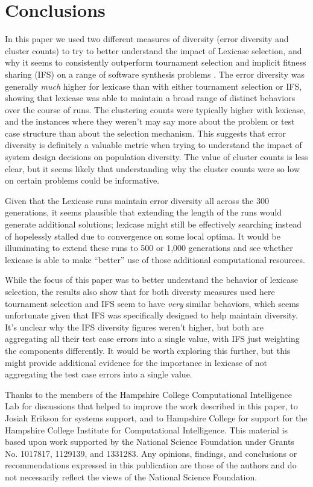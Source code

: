 \section{Conclusions}

In this paper we used two different measures of diversity (error diversity and cluster counts) to try to better understand the impact of Lexicase selection, and why it seems to consistently outperform tournament selection and implicit fitness sharing (IFS) on a range of software synthesis problems \cite{Helmuth:2015:GECCO}. The error diversity was generally \emph{much} higher for lexicase than with either tournament selection or IFS, showing that lexicase was able to maintain a broad range of distinct behaviors over the course of runs. The clustering counts were typically higher with lexicase, and the instances where they weren't may say more about the problem or test case structure than about the selection mechanism. This suggests that error diversity is definitely a valuable metric when trying to understand the impact of system design decisions on population diversity. The value of cluster counts is less clear, but it seems likely that understanding why the cluster counts were so low on certain problems could be informative.

Given that the Lexicase runs maintain error diversity all across the 300 generations, it seems plausible that extending the length of the runs would generate additional solutions; lexicase might still be effectively searching instead of hopelessly stalled due to convergence on some local optima. It would be illuminating to extend these runs to 500 or 1,000 generations and see whether lexicase is able to make ``better'' use of those additional computational resources.

While the focus of this paper was to better understand the behavior of lexicase selection, the results also show that for both diversty measures used here tournament selection and IFS seem to have \emph{very} similar behaviors, which seems unfortunate given that IFS was specifically designed to help maintain diversity. It's unclear why the IFS diversity figures weren't higher, but both are aggregating all their test case errors into a single value, with IFS just weighting the components differently. It would be worth exploring this further, but this might provide additional evidence for the importance in lexicase of not aggregating the test case errors into a single value.

\begin{acknowledgement}
	Thanks to the members of the Hampshire College Computational Intelligence Lab for discussions that helped to improve the work described in this paper, to Josiah Erikson for systems support, and to Hampshire College for support for the Hampshire College Institute for Computational Intelligence. This material is based upon work supported by the National Science Foundation under Grants No. 1017817, 1129139, and 1331283. Any opinions, findings, and conclusions or recommendations expressed in this publication are those of the authors and do not necessarily reflect the views of the National Science Foundation.
\end{acknowledgement}



